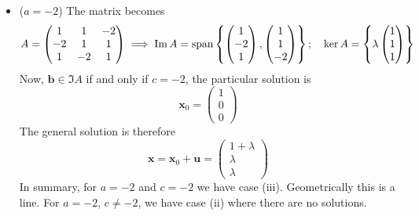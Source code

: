 \documentclass{article}
\begin{document}
\begin{itemize}
	\item ($a=-2$) The matrix becomes
	      \[ A = \begin{pmatrix}
			      1 & 1 & -2 \\ -2 & 1 & 1 \\ 1 & -2 & 1
		      \end{pmatrix} \implies \Im A = \operatorname{span} \left\{ \begin{pmatrix}
			      1 \\ -2 \\ 1
		      \end{pmatrix}, \begin{pmatrix}
			      1 \\ 1 \\ -2
		      \end{pmatrix} \right\};\quad \ker A = \left\{ \lambda\begin{pmatrix}
			      1 \\ 1 \\ 1
		      \end{pmatrix} \right\} \]
	      Now, $\bm b \in \Im A$ if and only if $c = -2$, the particular solution is
	      \[ \bm x_0 = \begin{pmatrix}
			      1 \\ 0 \\ 0
		      \end{pmatrix} \]
	      The general solution is therefore
	      \[ \bm x = \bm x_0 + \bm u = \begin{pmatrix}
			      1 + \lambda \\ \lambda \\ \lambda
		      \end{pmatrix} \]
	      In summary, for $a=-2$ and $c=-2$ we have case (iii). Geometrically this is a line. For $a=-2$, $c \neq -2$, we have case (ii) where there are no solutions.
\end{itemize}
\end{document}
